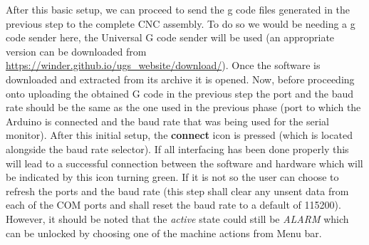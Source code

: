 After this basic setup, we can proceed to send the g code files generated in the previous step to the complete CNC assembly. To do so we would be needing a g code sender here, the Universal G code sender will be used (an appropriate version can be downloaded from \url{https://winder.github.io/ugs_website/download/}). Once the software is downloaded and extracted from its archive it is opened. Now, before proceeding onto uploading the obtained G code in the previous step the port and the baud rate should be the same as the one used in the previous phase (port to which the Arduino is connected and the baud rate that was being used for the serial monitor). After this initial setup, the \textbf{connect} icon is pressed (which is located alongside the baud rate selector). If all interfacing has been done properly this will lead to a successful connection between the software and hardware which will be indicated by this icon turning green. If it is not so the user can choose to refresh the ports and the baud rate (this step shall clear any unsent data from each of the COM ports and shall reset the baud rate to a default of 115200). However, it should be noted that the \textit{active} state could still be \textit{ALARM} which can be unlocked by choosing one of the machine actions from Menu bar. \par


